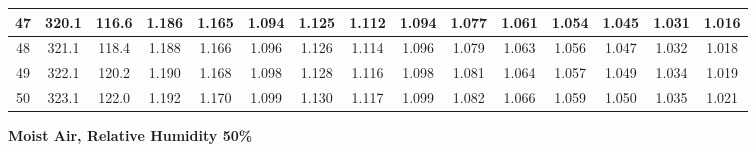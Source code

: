 \documentclass[12pt,a4paper,twoside]{article}
\begin{document}
\begin{center}
\begin{longtable}{ c c c | c c c c c c c c c c c c}
 47 & 320.1 & 116.6 & 1.186 & 1.165 & 1.094 & 1.125 & 1.112 & 1.094 & 1.077 & 1.061 & 1.054 & 1.045 & 1.031 & 1.016 \\ \hline   
 
 48 & 321.1 & 118.4 & 1.188 & 1.166 & 1.096 & 1.126 & 1.114 & 1.096 & 1.079 & 1.063 & 1.056 & 1.047 & 1.032 & 1.018 \\ \hline   
 
 49 & 322.1 & 120.2 & 1.190 & 1.168 & 1.098 & 1.128 & 1.116 & 1.098 & 1.081 & 1.064 & 1.057 & 1.049 & 1.034 & 1.019 \\ \hline   
 
 50 & 323.1 & 122.0 & 1.192 & 1.170 & 1.099 & 1.130 & 1.117 & 1.099 & 1.082 & 1.066 & 1.059 & 1.050 & 1.035 & 1.021 \\ \hline   
  \end{longtable}
  \end{center}
\clearpage
\textbf{Moist Air, Relative Humidity 50\%}
\end{document}
